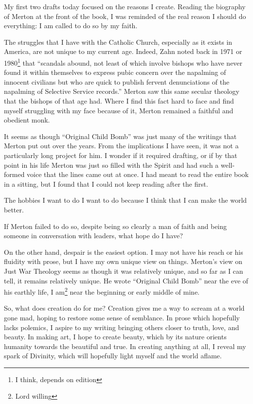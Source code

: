 \documentclass[12pt]{article}
\newcommand{\say}[1]{``#1''}
\renewcommand{\,}{\textsuperscript{,}}
\begin{document}
My first two drafts today focused on the reasons I create.
Reading the biography of Merton at the front of the book, I was reminded of the real reason I should do everything: I am called to do so by my faith.

The struggles that I have with the Catholic Church, especially as it exists in America, are not unique to my current age.
Indeed, Zahn noted back in 1971 or 1980\footnote{I think, depends on edition} that \say{scandals abound, not least of which involve bishops who have never found it within themselves to express pubic concern over the napalming of innocent civilians but who are quick to publish fervent denunciations of the napalming of Selective Service records.}
Merton saw this same secular theology that the bishops of that age had.
Where I find this fact hard to face and find myself struggling with my face because of it, Merton remained a faithful and obedient monk.

It seems as though \say{Original Child Bomb} was just many of the writings that Merton put out over the years.
From the implications I have seen, it was not a particularly long project for him.
I wonder if it required drafting, or if by that point in his life Merton was just so filled with the Spirit and had such a well-formed voice that the lines came out at once.
I had meant to read the entire book in a sitting, but I found that I could not keep reading after the first.

The hobbies I want to do I want to do because I think that I can make the world better.

If Merton failed to do so, despite being so clearly a man of faith and being someone in conversation with leaders, what hope do I have?

On the other hand, despair is the easiest option.
I may not have his reach or his fluidity with prose, but I have my own unique view on things.
Merton's view on Just War Theology seems as though it was relatively unique, and so far as I can tell, it remains relatively unique.
He wrote \say{Original Child Bomb} near the eve of his earthly life, I am\footnote{Lord willing} near the beginning or early middle of mine.

So, what does creation do for me? 
Creation gives me a way to scream at a world gone mad, hoping to restore some sense of semblance.
In prose which hopefully lacks polemics, I aspire to my writing bringing others closer to truth, love, and beauty.
In making art, I hope to create beauty, which by its nature orients humanity towards the beautiful and true.
In creating anything at all, I reveal my spark of Divinity, which will hopefully light myself and the world aflame.
\end{document}
